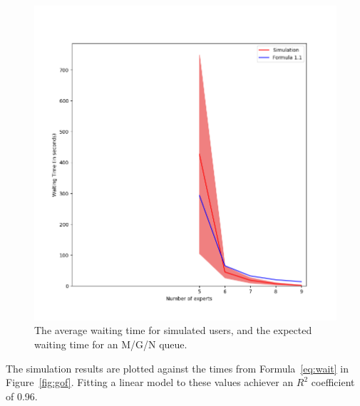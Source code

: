 \begin{figure}[H]
  \includegraphics[width=\textwidth]{figures/montecarlo/full_expected_sim.png}
  \caption{
    The average waiting time for simulated users, and the expected waiting time
    for an M/G/N queue.
  }\label{fig:full_expected_sim}
\end{figure}

The simulation results are plotted against the times from Formula~\ref{eq:wait}
in Figure~\ref{fig:gof}.
Fitting a linear model to these values achiever an $R^2$ coefficient of 0.96.

